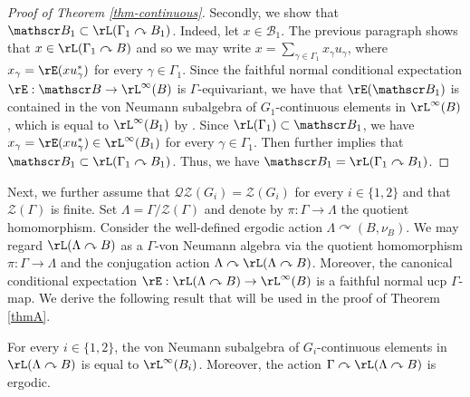\begin{proof}[Proof of Theorem \ref{thm-continuous}]
Secondly, we show that $\mathscr B_1 \subset \rL(\Gamma_1 \curvearrowright B_1)$. Indeed, let $x \in \mathscr B_1$. The previous paragraph shows that $x \in \rL(\Gamma_1 \curvearrowright B)$ and so we may write $x = \sum_{\gamma \in \Gamma_1} x_\gamma u_\gamma$, where $x_\gamma = \rE(x u_\gamma^*)$ for every $\gamma \in \Gamma_1$. Since the faithful normal conditional expectation $\rE : \mathscr B \to \rL^\infty(B)$ is $\Gamma$-equivariant, we have that $\rE(\mathscr B_1)$ is contained in the von Neumann subalgebra of $G_1$-continuous elements in $\rL^\infty(B)$, which is equal to $\rL^\infty(B_1)$ by \cite[Lem.\,5.4]{BBHP20}. Since $\rL(\Gamma_1) \subset \mathscr B_1$, we have $x_\gamma = \rE(x u_\gamma^*) \in \rL^\infty(B_1)$ for every $\gamma \in \Gamma_1$. Then \cite[Cor.\,3.4]{Su18} further implies that $\mathscr B_1 \subset \rL(\Gamma_1 \curvearrowright B_1)$. Thus, we have $\mathscr B_1 = \rL(\Gamma_1 \curvearrowright B_1)$.
\end{proof}

Next, we further assume that $\mathscr{Q}\mathscr{Z}(G_i) = \mathscr Z(G_i)$ for every $i \in \{1, 2\}$ and that $\mathscr Z(\Gamma)$ is finite. Set $\Lambda = \Gamma/\mathscr Z(\Gamma)$ and denote by $\pi : \Gamma \to \Lambda$ the quotient homomorphism. Consider the well-defined ergodic action $\Lambda \curvearrowright (B, \nu_B)$. We may regard $\rL(\Lambda \curvearrowright B)$ as a $\Gamma$-von Neumann algebra via the quotient homomorphism $\pi : \Gamma \to \Lambda$ and the conjugation action $\Lambda \curvearrowright \rL(\Lambda \curvearrowright B)$. Moreover, the canonical conditional expectation $\rE : \rL(\Lambda \curvearrowright B) \to \rL^\infty(B)$ is a faithful normal ucp $\Gamma$-map. We derive the following result that will be used in the proof of Theorem \ref{thmA}.

\begin{cor}\label{cor-ergodic}
For every $i \in \{1, 2\}$, the von Neumann subalgebra of $G_i$-continuous elements in $\rL(\Lambda \curvearrowright B)$ is equal to $\rL^\infty(B_i)$. Moreover, the action $\Gamma \curvearrowright \rL(\Lambda \curvearrowright B)$ is ergodic.
\end{cor}

